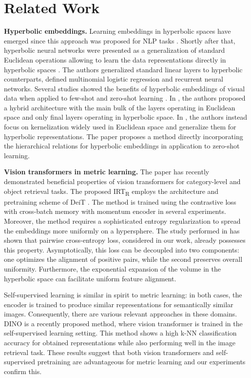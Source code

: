 \documentclass[10pt,twocolumn,letterpaper]{article}
\begin{document}
\section{Related Work}
\label{sec:related}
{\bf Hyperbolic embeddings.} Learning embeddings in hyperbolic spaces have emerged since this approach was proposed for NLP tasks \cite{nickel2017poincare,nickel2018learning}. Shortly after that, hyperbolic neural networks were presented as a generalization of standard Euclidean operations allowing to learn the data representations directly in hyperbolic spaces \cite{ganea2019hyperbolic}. The authors generalized standard linear layers to hyperbolic counterparts, defined multinomial logistic regression and recurrent neural networks. Several studies showed the benefits of hyperbolic embeddings of visual data when applied to few-shot \cite{khrulkov2020hyperbolic,gao2021curvature,fang2021kernel} and zero-shot learning \cite{liu2020hyperbolic,fang2021kernel}. In \cite{khrulkov2020hyperbolic}, the authors proposed a hybrid architecture with the main bulk of the layers operating in Euclidean space and only final layers operating in hyperbolic space. In \cite{fang2021kernel}, the authors instead focus on kernelization widely used in Euclidean space and generalize them for hyperbolic representations. The paper \cite{liu2020hyperbolic} proposes a method directly incorporating the hierarchical relations for hyperbolic embeddings in application to zero-shot learning.

{\bf Vision transformers in metric learning.}
The paper \cite{IRT} has recently demonstrated beneficial properties of vision transformers for category-level and object retrieval tasks. The proposed IRT\textsubscript{R} employs the architecture and pretraining scheme of DeiT \cite{deit}. The method is trained using the contrastive loss with cross-batch memory \cite{XBM} with momentum encoder \cite{moco} in several experiments. Moreover, the method requires a sophisticated entropy regularization to spread the embeddings more uniformly on a hypersphere. The study performed in \cite{uniformity} has shown that pairwise cross-entropy loss, considered in our work, already possesses this property. 
Asymptotically, this loss can be decoupled into two components: one optimizes the alignment of positive pairs, while the second preserves overall uniformity. Furthermore, the exponential expansion of the volume in the hyperbolic space can facilitate uniform feature alignment.

Self-supervised learning is similar in spirit to metric learning: in both cases, the encoder is trained to produce similar representations for semantically similar images. Consequently, there are various relevant approaches in these domains. DINO \cite{dino} is a recently proposed method, where vision transformer is trained in the self-supervised learning setting. This method shows a high k-NN classification accuracy for obtained representations while also performing well in the image retrieval task. These results suggest that both vision transformers and self-supervised pretraining are advantageous for metric learning and our experiments confirm this.
\end{document}
